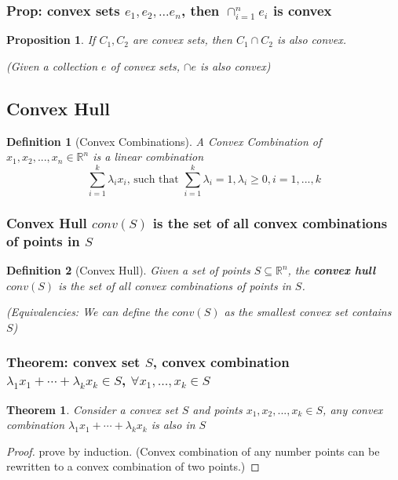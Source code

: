 \documentclass[11pt,a4paper]{article}
\newtheorem{theorem}{Theorem}
\newtheorem{proposition}{Proposition}
\newtheorem{definition}{Definition}
\begin{document}
\subsubsection{Prop: convex sets $e_1,e_2,...e_n$, then $\cap_{i=1}^ne_i$ is convex}
\begin{proposition}
    If $C_1,C_2$ are convex sets, then $C_1\cap C_2$ is also convex.

    (Given a collection $e$ of convex sets, $\cap e$ is also convex)
\end{proposition}

\subsection{Convex Hull}
\begin{definition}[Convex Combinations]
A Convex Combination of $x_1,x_2,...,x_n\in \mathbb{R}^n$ is a linear combination $$\sum_{i=1}^k\lambda_ix_i\text{, such that }\sum_{i=1}^k\lambda_i=1,\lambda_i\geq 0,i=1,...,k$$
\end{definition}

\subsubsection{Convex Hull $conv(S)$ is the set of all convex combinations of points in $S$}
\begin{definition}[Convex Hull]
Given a set of points $S\subseteq \mathbb{R}^n$, the \textbf{convex hull} $conv(S)$ is the set of all convex combinations of points in $S$.

(Equivalencies: We can define the $conv(S)$ as the smallest convex set contains $S$)
\end{definition}

\subsubsection{Theorem: convex set $S$, convex combination $\lambda_1 x_1+\cdots+\lambda_k x_k\in S$, $\forall x_1,...,x_k\in S$}
\begin{theorem}
Consider a convex set $S$ and points $x_1,x_2,...,x_k\in S$, any convex combination $\lambda_1 x_1+\cdots+\lambda_k x_k$ is also in $S$
\end{theorem}
\begin{proof}
prove by induction. (Convex combination of any number points can be rewritten to a convex combination of two points.)
\end{proof}
\end{document}
